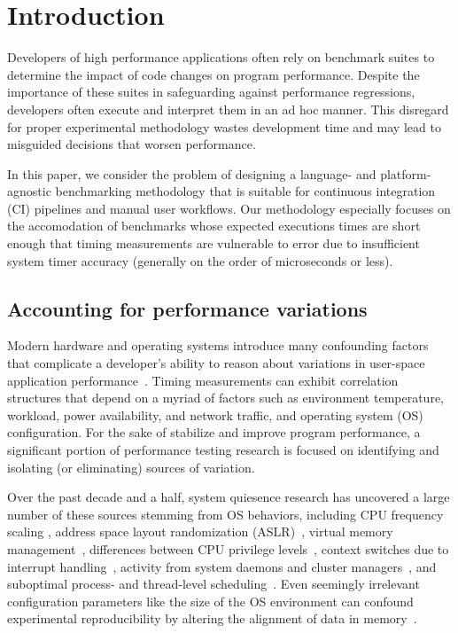 \documentclass[conference]{IEEEtran}
\begin{document}
\IEEEpeerreviewmaketitle

\label{sec:intro}
\section{Introduction}

Developers of high performance applications often rely on benchmark suites to determine the
impact of code changes on program performance. Despite the importance of these suites in
safeguarding against performance regressions, developers often execute and interpret them in
an ad hoc manner. This disregard for proper experimental methodology wastes development time
and may lead to misguided decisions that worsen performance.

In this paper, we consider the problem of designing a language- and platform-agnostic
benchmarking methodology that is suitable for continuous integration (CI) pipelines and
manual user workflows. Our methodology especially focuses on the accomodation of benchmarks
whose expected executions times are short enough that timing measurements are vulnerable to
error due to insufficient system timer accuracy (generally on the order of microseconds
or less).

\label{sec:variations}
\subsection{Accounting for performance variations}

Modern hardware and operating systems introduce many confounding factors that complicate a
developer's ability to reason about variations in user-space application
performance~\cite{HP5e}. Timing measurements can exhibit correlation structures that depend
on a myriad of factors such as environment temperature, workload, power availability, and
network traffic, and operating system (OS) configuration. For the sake of stabilize and
improve program performance, a significant portion of performance testing research is
focused on identifying and isolating (or eliminating) sources of variation.

Over the past decade and a half, system quiesence research has uncovered a large number of
these sources stemming from OS behaviors, including CPU frequency scaling \cite{RHEL6},
address space layout randomization (ASLR)~\cite{Shacham2004}, virtual memory
management~\cite{Oyama2014,Oyama2016}, differences between CPU privilege
levels~\cite{Zaparanuks2009}, context switches due to interrupt handling~\cite{Tsafrir2007},
activity from system daemons and cluster managers~\cite{Petrini2003}, and suboptimal
process- and thread-level scheduling~\cite{Lozi2016}. Even seemingly irrelevant
configuration parameters like the size of the OS environment can confound experimental
reproducibility by altering the alignment of data in memory~\cite{Mytkowicz2009}.
\end{document}
